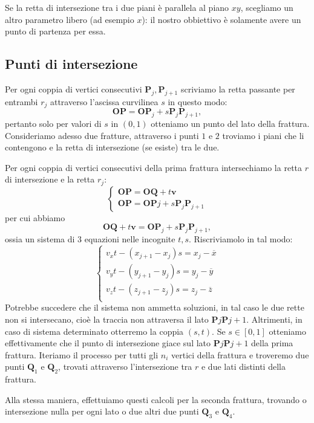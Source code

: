 \documentclass[a4paper]{article}
\newcommand{\B}{\mathbf}
\begin{document}
Se la retta di intersezione tra i due piani è parallela al piano $xy$, scegliamo un altro parametro libero (ad esempio $x$): il nostro obbiettivo è solamente avere un punto di partenza per essa.
\subsection{Punti di intersezione}
Per ogni coppia di vertici consecutivi $\B{P}_j,\B{P}_{j+1}$ scriviamo la retta passante per entrambi $r_j$ attraverso l'ascissa curvilinea $s$ in questo modo: 
$$
\B{OP}=\B{OP}_j+s\B{P}_j\B{P}_{j+1},
$$
pertanto solo per valori di $s$ in $(0,1)$ otteniamo un punto del lato della frattura. 
Consideriamo adesso due fratture, attraverso i punti $1$ e $2$ troviamo i piani che li contengono e la retta di intersezione (se esiste) tra le due.

Per ogni coppia di vertici consecutivi della prima frattura intersechiamo la retta $r$ di intersezione e la retta $r_j$:
$$
\begin{cases}
\B{OP}=\B{OQ}+t\B{v} \\ 
\B{OP}=\B{OP}j+s\B{P}_j\B{P}_{j+1}
\end{cases}
$$
per cui abbiamo $$\B{OQ}+t\B{v}=\B{OP}_j+s\B{P}_j\B{P}_{j+1},$$ ossia un sistema di $3$ equazioni nelle incognite $t,s$. Riscriviamolo in tal modo:
\begin{equation} \label{sis:parametri}
\begin{cases}
v_xt-(x_{j+1}-x_j)s=x_j-\overline{x} \\
v_yt-(y_{j+1}-y_j)s=y_j-\overline{y} \\
v_zt-(z_{j+1}-z_j)s=z_j-\overline{z} \\
\end{cases}
\end{equation}
Potrebbe succedere che il sistema non ammetta soluzioni, in tal caso le due rette non si intersecano, cioè la traccia non attraversa il lato $\B{P}j\B{P}{j+1}$. Altrimenti, in caso di sistema determinato otterremo la coppia $(s,t)$. Se $s\in[0,1]$ otteniamo effettivamente che il punto di intersezione giace sul lato $\B{P}j\B{P}{j+1}$ della prima frattura. Iteriamo il processo per tutti gli $n_i$ vertici della frattura e troveremo due punti $\B{Q}_1$ e $\B{Q}_2$, trovati attraverso l'intersezione tra $r$ e due lati distinti della frattura.

Alla stessa maniera, effettuiamo questi calcoli per la seconda frattura, trovando o intersezione nulla per ogni lato o due altri due punti $\B{Q}_3$ e $\B{Q}_4$.
\end{document}
